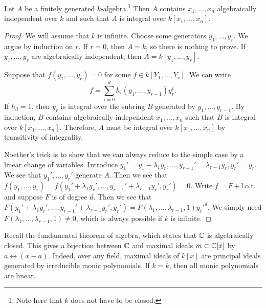 \documentclass[twoside, 10pt]{article}
\begin{document}
    \begin{thm}
        Let $A$ be a finitely generated $k$-algebra.\footnote{Note here that $k$ does not have to be closed.} Then $A$ contains $x_1, \ldots, x_n$ algebraically independent over $k$ and such that $A$ is integral over $k[x_1, \ldots, x_n]$.
        \begin{proof}
            We will assume that $k$ is infinite. Choose some generators $y_1, \ldots, y_r$. We argue by induction on $r$. If $r=0$, then $A=k$, so there is nothing to prove. If $y_1, \ldots, y_r$ are algebraically independent, then $A=k[y_1, \ldots, y_r]$. 
            
            Suppose that $f(y_1, \ldots, y_r) = 0$ for some $f \in k[Y_1, \ldots, Y_r]$. We can write \[ f = \sum_{i=0}^d h_i(y_1, \ldots, y_{r-1})y_r^i. \] If $h_d = 1$, then $y_r$ is integral over the subring $B$ generated by $y_1, \ldots, y_{r-1}$. By induction, $B$ contains algebraically independent $x_1, \ldots, x_n$ such that $B$ is integral over $k[x_1, \ldots, x_n]$. Therefore, $A$ must be integral over $k[x_1, \ldots, x_n]$ by transitivity of integrality.

            Noether's trick is to show that we can always reduce to the simple case by a linear change of variables. Introduce $y_1'=y_1-  \lambda_1y_r, \ldots, y_{r-1}'=\lambda_{r-1}y_r, y_r' = y_r$. We see that $y_1', \ldots, y_r'$ generate $A$. Then we see that $f(y_1, \ldots, y_r) = f(y_1' + \lambda_1y_r', \ldots, y_{r-1}'+\lambda_{r-1}y_r', y_r') = 0$. Write $f = F + \mathrm{l.o.t.}$ and suppose $F$ is of degree $d$. Then we see that $F(y_1' + \lambda_1y_r', \ldots, y_{r-1}'+\lambda_{r-1}y_r', y_r') = F(\lambda_1, \ldots, \lambda_{r-1}, 1)y_r'^d$. We simply need $F(\lambda_1, \ldots, \lambda_{r-1}, 1) \neq 0$, which is always possible if $k$ is infinite.
        \end{proof}
    \end{thm}

    Recall the fundamental theorem of algebra, which states that $\mathbb{C}$ is algebraically closed. This gives a bijection between $\mathbb{C}$ and maximal ideals $m \subset \mathbb{C}[x]$ by $a \leftrightarrow (x-a)$. Indeed, over any field, maximal ideals of $k[x]$ are principal ideals generated by irreducible monic polynomials. If $k = \overline{k}$, then all monic polynomials are linear.
\end{document}
